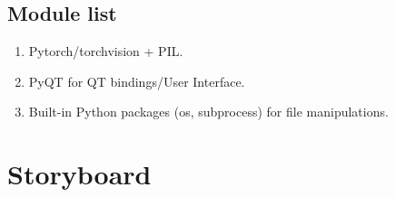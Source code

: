 \documentclass[12pt]{article}
\begin{document}
\subsection{Module list}
\begin{enumerate}
	\item Pytorch/torchvision + PIL.
	\item PyQT for QT bindings/User Interface.
	\item Built-in Python packages (os, subprocess) for file manipulations.
\end{enumerate}
\section{Storyboard}
\end{document}
